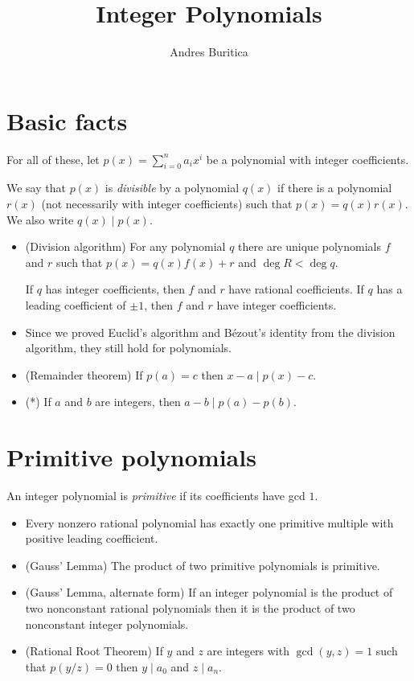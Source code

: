 \documentclass{article}
\title{Integer Polynomials}
\author{Andres Buritica}
\date{}
\begin{document}
\maketitle
\section{Basic facts}
For all of these, let $p(x)=\sum_{i=0}^n a_i x^i$ be a polynomial with integer
coefficients. 

We say that $p(x)$ is \emph{divisible} by a polynomial $q(x)$ if there is a
polynomial $r(x)$ (not necessarily with integer coefficients) such that
$p(x)=q(x)r(x)$. We also write $q(x)\mid p(x)$.
\begin{itemize}
  \item (Division algorithm) For any polynomial $q$ there are unique
    polynomials $f$ and $r$ such that $p(x)=q(x)f(x)+r$ and $\deg R<\deg q$.

    If $q$ has integer coefficients, then $f$ and $r$ have rational
    coefficients. If $q$ has a leading coefficient of $\pm 1$, then $f$ and $r$
    have integer coefficients.
  \item Since we proved Euclid's algorithm and B\'ezout's identity from the
    division algorithm, they still hold for polynomials.
  \item (Remainder theorem) If $p(a)=c$ then $x-a\mid p(x)-c$.
  \item (*) If $a$ and $b$ are integers, then $a-b\mid p(a)-p(b)$.
\end{itemize}
\section{Primitive polynomials}
An integer polynomial is \emph{primitive} if its coefficients have gcd $1$.
\begin{itemize}
  \item Every nonzero rational polynomial has exactly one primitive multiple
    with positive leading coefficient.
  \item (Gauss' Lemma) The product of two primitive polynomials is primitive.
  \item (Gauss' Lemma, alternate form) If an integer polynomial is the product
    of two nonconstant rational polynomials then it is the product of two
    nonconstant integer polynomials.
  \item (Rational Root Theorem) If $y$ and $z$ are integers with $\gcd(y,z)=1$
    such that $p(y/z)=0$ then $y\mid a_0$ and $z\mid a_n$.
\end{itemize}
\end{document}
